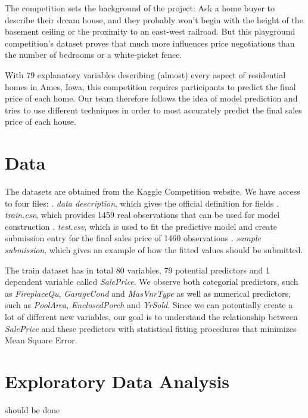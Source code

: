 \documentclass[a4paper]{article}
\begin{document}
\begin{flushleft}
The competition sets the background of the project: Ask a home buyer to describe their dream house, and they probably won't begin with the height of the basement ceiling or the proximity to an east-west railroad. But this playground competition's dataset proves that much more influences price negotiations than the number of bedrooms or a white-picket fence. \newline

With 79 explanatory variables describing (almost) every aspect of residential homes in Ames, Iowa, this competition requires participants to predict the final price of each home. Our team therefore follows the idea of model prediction and tries to use different techniques in order to most accurately predict the final sales price of each house. \newline


\section{Data}

The datasets are obtained from the Kaggle Competition website. We have access to four files: . \textit{data description}, which gives the official definition for fields . \textit{train.csv}, which provides 1459 real observations that can be used for model construction . \textit{test.csv}, which is used to fit the predictive model and create submission entry for the final sales price of 1460 observations . \textit{sample submission}, which gives an example of how the fitted values should be submitted. \newline

The train dataset has in total 80 variables, 79 potential predictors and 1 dependent variable called \textit{SalePrice}. We observe both categorial predictors, such as \textit{FireplaceQu}, \textit{GarageCond} and \textit{MasVnrType} as well as numerical predictors, such as \textit{PoolArea}, \textit{EnclosedPorch} and \textit{YrSold}. Since we can potentially create a lot of different new variables, our goal is to understand the relationship between \textit{SalePrice} and these predictors with statistical fitting procedures that minimizes Mean Square Error.

\section{Exploratory Data Analysis} 
should be done


\end{flushleft}
\end{document}
